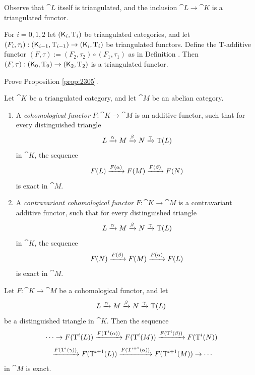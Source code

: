 Observe that $\cat{L}$ itself is triangulated, and the inclusion 
$\cat{L} \to \cat{K}$ is a triangulated functor. 

\begin{prop} \label{prop:2305}
For $i = 0, 1, 2$ let $(\operatorname{\mathsf{K}}_i, \operatorname{T}_i)$ be triangulated categories, and 
let 
$(F_i, \tau_i) : (\operatorname{\mathsf{K}}_{i - 1}, \operatorname{T}_{i - 1}) \to 
(\operatorname{\mathsf{K}}_i, \operatorname{T}_i)$ 
be triangulated functors. Define the T-additive functor 
$(F, \tau) := (F_2, \tau_2) \circ (F_1, \tau_1)$
as in Definition \tup{\ref{dfn:1840}}. Then 
$(F, \tau) : (\operatorname{\mathsf{K}}_0, \operatorname{T}_0) \to (\operatorname{\mathsf{K}}_2, \operatorname{T}_2)$
is a triangulated functor. 
\end{prop}

\begin{exer} \label{exer:2300}
Prove Proposition \ref{prop:2305}. 
\end{exer}

\begin{dfn} \label{dfn:1510}
Let $\cat{K}$ be a triangulated category, and let $\cat{M}$ be an 
abelian category. 
\begin{enumerate}
\item A {\em cohomological functor}%
$F : \cat{K} \to \cat{M}$ is an
additive functor, such that for every distinguished triangle 
\[ L \xrightarrow{\alpha} M \xrightarrow{\beta} N \xrightarrow{\gamma} \operatorname{T}(L) \] 
in $\cat{K}$, the sequence 
\[ F(L) \xrightarrow{F(\alpha)} F(M) \xrightarrow{F(\beta)} F(N) \] 
is exact in $\cat{M}$.

\item A {\em contravariant cohomological functor}%
$F : \cat{K} \to \cat{M}$ is 
a contravariant  additive functor, such that for every distinguished triangle 
\[ L \xrightarrow{\alpha} M \xrightarrow{\beta} N \xrightarrow{\gamma} \operatorname{T}(L) \] 
in $\cat{K}$, the sequence 
\[ F(N) \xrightarrow{F(\beta)} F(M) \xrightarrow{F(\alpha)} F(L) \] 
is exact in $\cat{M}$.
\end{enumerate}
\end{dfn}

\begin{prop} \label{prop:1281}
Let  $F : \cat{K} \to \cat{M}$ be a cohomological functor, and let 
\[ L \xrightarrow{\alpha} M \xrightarrow{\beta} N \xrightarrow{\gamma} \operatorname{T}(L) \]
be a distinguished triangle in $\cat{K}$. Then the sequence 
\[ \begin{aligned}
&    \cdots \to F(\operatorname{T}^i(L)) \xrightarrow{F(\operatorname{T}^i(\alpha))} F(\operatorname{T}^i(M)) 
\xrightarrow{F(\operatorname{T}^i(\beta))} F(\operatorname{T}^i(N)) 
\\[0.2em]
& \hspace{2ex}
\xrightarrow{F(\operatorname{T}^i(\gamma))} F(\operatorname{T}^{i + 1}(L))
\xrightarrow{F(\operatorname{T}^{i + 1}(\alpha))} F(\operatorname{T}^{i + 1}(M)) \to \cdots 
\end{aligned} \]
in $\cat{M}$ is exact.
\end{prop}

